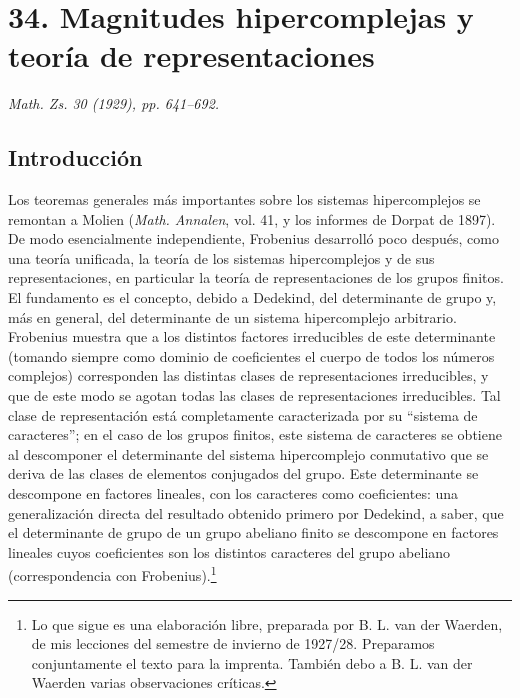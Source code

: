 \documentclass[11pt]{article}
\begin{document}
\setcounter{footnote}{0}

\section*{34. Magnitudes hipercomplejas y teoría de representaciones}
\emph{Math. Zs. 30 (1929), pp. 641--692.}

\subsection*{Introducción}

Los teoremas generales más importantes sobre los sistemas hipercomplejos se remontan a Molien (\emph{Math. Annalen}, vol. 41, y los informes de Dorpat de 1897). De modo esencialmente independiente, Frobenius desarrolló poco después, como una teoría unificada, la teoría de los sistemas hipercomplejos y de sus representaciones, en particular la teoría de representaciones de los grupos finitos. El fundamento es el concepto, debido a Dedekind, del determinante de grupo y, más en general, del determinante de un sistema hipercomplejo arbitrario. Frobenius muestra que a los distintos factores irreducibles de este determinante (tomando siempre como dominio de coeficientes el cuerpo de todos los números complejos) corresponden las distintas clases de representaciones irreducibles, y que de este modo se agotan todas las clases de representaciones irreducibles. Tal clase de representación está completamente caracterizada por su ``sistema de caracteres''; en el caso de los grupos finitos, este sistema de caracteres se obtiene al descomponer el determinante del sistema hipercomplejo conmutativo que se deriva de las clases de elementos conjugados del grupo. Este determinante se descompone en factores lineales, con los caracteres como coeficientes: una generalización directa del resultado obtenido primero por Dedekind, a saber, que el determinante de grupo de un grupo abeliano finito se descompone en factores lineales cuyos coeficientes son los distintos caracteres del grupo abeliano (correspondencia con Frobenius).\footnote{Lo que sigue es una elaboración libre, preparada por B. L. van der Waerden, de mis lecciones del semestre de invierno de 1927/28. Preparamos conjuntamente el texto para la imprenta. También debo a B. L. van der Waerden varias observaciones críticas.}
\end{document}
